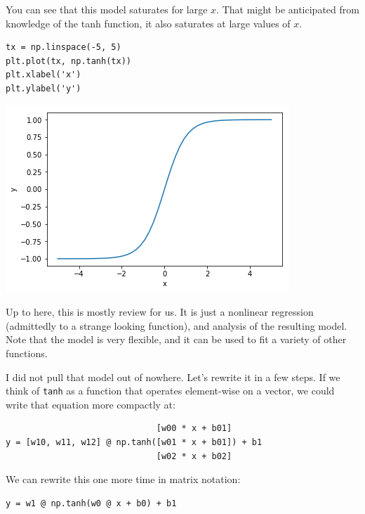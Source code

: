 \documentclass[11pt]{article}
\begin{document}
You can see that this model saturates for large \(x\). That might be anticipated from knowledge of the tanh function, it also saturates at large values of \(x\).

\begin{verbatim}
tx = np.linspace(-5, 5)
plt.plot(tx, np.tanh(tx))
plt.xlabel('x')
plt.ylabel('y')
\end{verbatim}

\begin{center}
\includegraphics[width=.9\linewidth]{obipy-resources/de048b6a9afb1b9e2b48e7a057512e1e-7030453g.png}
\end{center}


Up to here, this is mostly review for us. It is just a nonlinear regression (admittedly to a strange looking function), and analysis of the resulting model. Note that the model is very flexible, and it can be used to fit a variety of other functions.

I did not pull that model out of nowhere. Let's rewrite it in a few steps. If we think of \texttt{tanh} as a function that operates element-wise on a vector, we could write that equation more compactly at:

\begin{verbatim}
                              [w00 * x + b01]
y = [w10, w11, w12] @ np.tanh([w01 * x + b01]) + b1
                              [w02 * x + b02]
\end{verbatim}

We can rewrite this one more time in matrix notation:

\begin{verbatim}
y = w1 @ np.tanh(w0 @ x + b0) + b1
\end{verbatim}
\end{document}
